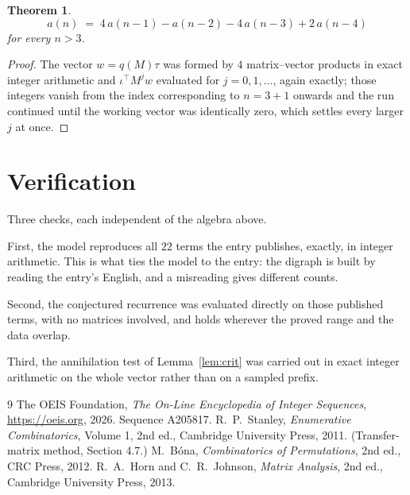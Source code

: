 \documentclass[11pt,a4paper]{article}
\theoremstyle{plain}
\newtheorem{theorem}{Theorem}
\theoremstyle{definition}
\begin{document}
\begin{theorem}
\[
a(n)\;=\;4\,a(n-1) - a(n-2) - 4\,a(n-3) + 2\,a(n-4)
\]
for every $n>3$.
\end{theorem}

\begin{proof}
The vector $w=q(M)\tau$ was formed by $4$ matrix--vector products in exact integer
arithmetic and $\iota^{\!\top}M^{j}w$ evaluated for $j=0,1,\dots$, again exactly; those
integers vanish from the index corresponding to $n=3+1$ onwards and the run continued
until the working vector was identically zero, which settles every larger $j$ at once.
\end{proof}

\section{Verification}

Three checks, each independent of the algebra above.

First, the model reproduces all $22$ terms the entry publishes, exactly, in integer
arithmetic. This is what ties the model to the entry: the digraph is built by reading the
entry's English, and a misreading gives different counts.

Second, the conjectured recurrence was evaluated directly on those published terms, with no
matrices involved, and holds wherever the proved range and the data overlap.

Third, the annihilation test of Lemma~\ref{lem:crit} was carried out in exact integer
arithmetic on the whole vector rather than on a sampled prefix.

\begin{thebibliography}{9}
 The OEIS Foundation, \emph{The On-Line Encyclopedia of Integer
Sequences}, \url{https://oeis.org}, 2026. Sequence A205817.
 R.~P.~Stanley, \emph{Enumerative Combinatorics}, Volume 1, 2nd ed.,
Cambridge University Press, 2011. (Transfer-matrix method, Section 4.7.)
 M.~B\'ona, \emph{Combinatorics of Permutations}, 2nd ed., CRC
Press, 2012.
 R.~A.~Horn and C.~R.~Johnson, \emph{Matrix Analysis}, 2nd ed., Cambridge
University Press, 2013.
\end{thebibliography}
\end{document}
